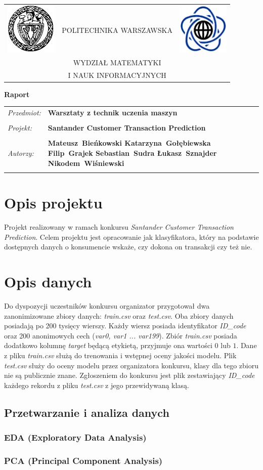 \documentclass[12pt]{article}
\renewcommand{\maketitle}{
\begin{titlepage}
\begin{table}[t]
\centering
\begin{tabular}[t]{lcr}
 \includegraphics[width=70pt,height=70pt]{PW} & POLITECHNIKA WARSZAWSKA & \includegraphics[width=70pt,height=70pt]{MiNI}\\
& WYDZIAŁ MATEMATYKI & \\
& I NAUK INFORMACYJNYCH &
\end{tabular}
\end{table}
\vspace*{3cm}
  \begin{center}
    \LARGE
    \textbf {Raport}\\
   \vspace*{2 cm}
\begin{table}[!htp]
\begin{tabular}{p{4cm}p{10cm}}
\textit{Przedmiot:} &\textbf {Warsztaty z technik uczenia maszyn} \\
\\
\textit{Projekt:} &\textbf {Santander Customer Transaction Prediction} \\
\\
\textit{Autorzy:} &\textbf {Mateusz~Bieńkowski \newline
	Katarzyna~Gołębiewska \newline
	Filip~Grajek \newline
	Sebastian~Sudra \newline
	Łukasz~Sznajder \newline
	Nikodem~Wiśniewski \newline 
 } \\
\\
\end{tabular}
\end{table}

\vspace{5 cm}
  \center{\small Warszawa, dnia \today}
\end{center}
\end{titlepage}
}
\begin{document}
\maketitle

\newpage

\section{Opis projektu}

Projekt realizowany w ramach konkursu \textit{Santander Customer Transaction Prediction}\cite{santanderkaggle}. Celem projektu jest opracowanie jak klasyfikatora, który na podstawie dostępnych danych o konsumencie wskaże, czy dokona on transakcji czy też nie. 

\section{Opis danych}

Do dyspozycji uczestników konkursu organizator przygotował dwa zanonimizowane zbiory danych: \textit{train.csv} oraz \textit{test.csv}. Oba zbiory danych posiadają po 200 tysięcy wierszy. Każdy wiersz posiada identyfikator \textit{ID\_code} oraz 200 anonimowych cech (\textit{var0, var1 ... var199}). Zbiór \textit{train.csv} posiada dodatkowo kolumnę \textit{target} będącą etykietą, przyjmuje ona wartości $0$ lub $1$. Dane z pliku \textit{train.csv} służą do trenowania i wstępnej oceny jakości modelu. Plik \textit{test.csv} służy do oceny modelu przez organizatora konkursu, klasy dla tego zbioru nie są publicznie znane. Zgłoszeniem do konkursu jest plik zestawiający \textit{ID\_code} każdego rekordu z pliku \textit{test.csv} z jego przewidywaną klasą.


\subsection{Przetwarzanie i analiza danych}



\subsubsection{EDA (Exploratory Data Analysis)}



\subsubsection{PCA (Principal Component Analysis)}
\end{document}
